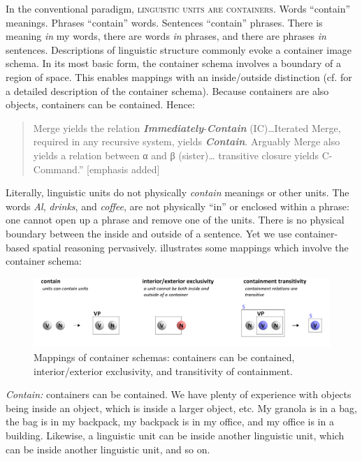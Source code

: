 In the conventional paradigm, \textsc{linguistic units are containers}. Words “contain” meanings. Phrases “contain” words. Sentences “contain” phrases. There is meaning \textit{in} my words, there are words \textit{in} phrases, and there are phrases \textit{in} sentences. Descriptions of linguistic structure commonly evoke a container image schema. In its most basic form, the container schema involves a boundary of a region of space. This enables mappings with an inside/outside distinction (cf. \citet{LakoffNúñez2000} for a detailed description of the container schema). Because containers are also objects, containers can be contained. Hence:

\begin{quote}
    Merge yields the relation \textbf{\textit{Immediately}}{}-\textbf{\textit{Contain}} (IC)…Iterated Merge, required in any recursive system, yields \textbf{\textit{Contain}}. Arguably Merge also yields a relation between α and β (sister)… transitive closure yields C-Command.” \citep[3]{Chomsky2001b} [emphasis added]
\end{quote}

  Literally, linguistic units do not physically \textit{contain} meanings or other units. The words \textit{Al}, \textit{drinks}, and \textit{coffee}, are not physically “in” or enclosed within a phrase: one cannot open up a phrase and remove one of the units. There is no physical boundary between the inside and outside of a sentence. Yet we use container-based spatial reasoning pervasively. {} illustrates some mappings which involve the container schema:

  
\begin{figure}
\includegraphics[width=\textwidth]{figures/Tilsen-img32.png}
\caption{Mappings of container schemas: containers can be contained, interior/exterior exclusivity, and transitivity of containment.}
\label{fig:3:4}
\end{figure}
 

\textit{Contain:} containers can be contained. We have plenty of experience with objects being inside an object, which is inside a larger object, etc. My granola is in a bag, the bag is in my backpack, my backpack is in my office, and my office is in a building. Likewise, a linguistic unit can be inside another linguistic unit, which can be inside another linguistic unit, and so on.

